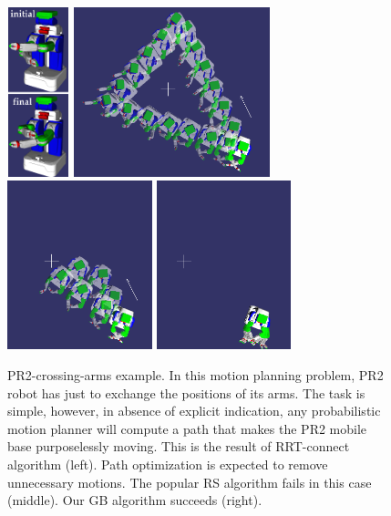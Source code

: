 \documentclass{tADR2e}
\begin{document}
\begin{figure}
	\centering
	\includegraphics[height=4.9cm,width=1.8cm]{pr2_initial_final_vertical.png}
	\includegraphics[width=5.7cm]{p0_pr2_alone_merged3.png}
	\includegraphics[height=4.9cm]{p1RS_pr2_alone_merged3.png}
	\includegraphics[height=4.9cm]{p1GB_pr2_alone_merged3.png}\\
	\caption{PR2-crossing-arms example. In this motion planning problem, PR2 robot 
	has just to 
exchange the positions of its arms. The task is simple, however, in absence of 
explicit indication, any probabilistic motion planner will compute a path that 
makes the PR2 mobile base purposelessly moving. This is the result of RRT-connect 
algorithm (left). Path optimization is expected to remove unnecessary motions. 
The popular RS algorithm fails in this case (middle). Our GB algorithm 
succeeds (right).}
	\label{pr2_final}
\end{figure}
\end{document}
